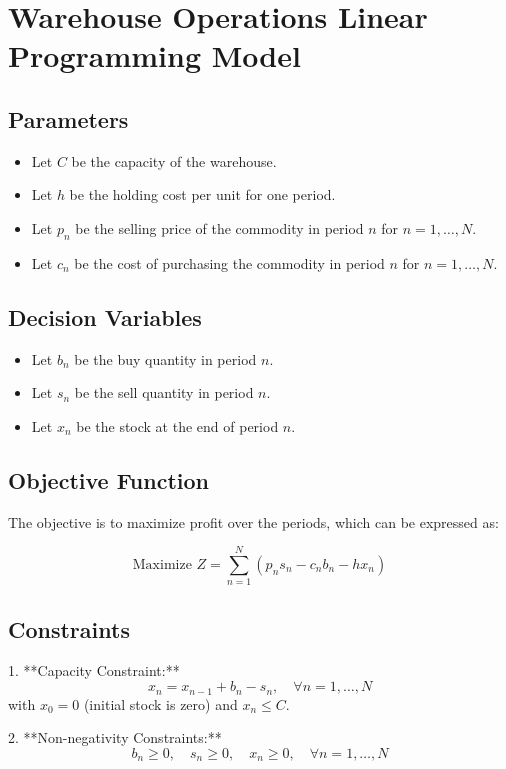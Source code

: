 \documentclass{article}
\begin{document}
\section*{Warehouse Operations Linear Programming Model}

\subsection*{Parameters}
\begin{itemize}
    \item Let \( C \) be the capacity of the warehouse.
    \item Let \( h \) be the holding cost per unit for one period.
    \item Let \( p_n \) be the selling price of the commodity in period \( n \) for \( n = 1, \ldots, N \).
    \item Let \( c_n \) be the cost of purchasing the commodity in period \( n \) for \( n = 1, \ldots, N \).
\end{itemize}

\subsection*{Decision Variables}
\begin{itemize}
    \item Let \( b_n \) be the buy quantity in period \( n \).
    \item Let \( s_n \) be the sell quantity in period \( n \).
    \item Let \( x_n \) be the stock at the end of period \( n \).
\end{itemize}

\subsection*{Objective Function}
The objective is to maximize profit over the periods, which can be expressed as:

\[
\text{Maximize } Z = \sum_{n=1}^{N} (p_n s_n - c_n b_n - h x_n)
\]

\subsection*{Constraints}
1. **Capacity Constraint:**
   \[
   x_n = x_{n-1} + b_n - s_n, \quad \forall n = 1, \ldots, N
   \]
   with \( x_0 = 0 \) (initial stock is zero) and \( x_n \leq C \).

2. **Non-negativity Constraints:**
   \[
   b_n \geq 0, \quad s_n \geq 0, \quad x_n \geq 0, \quad \forall n = 1, \ldots, N
   \]
\end{document}
